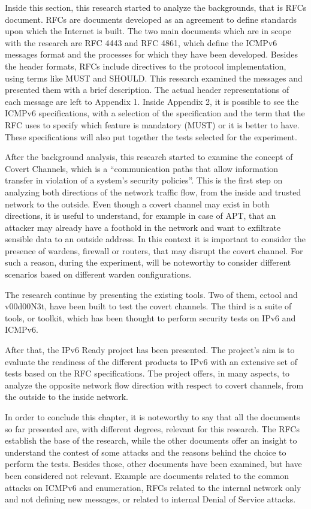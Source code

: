 \documentclass[12pt]{article}
\begin{document}
Inside this section, this research started to analyze the backgrounds, that is RFCs document. RFCs are documents developed as an agreement to define standards upon which the Internet is built. The two main documents which are in scope with the research are RFC 4443 and RFC 4861, which define the ICMPv6 messages format and the processes for which they have been developed. Besides the header formats, RFCs include directives to the protocol implementation, using terms like MUST and SHOULD. This research examined the messages and presented them with a brief description. The actual header representations of each message are left to Appendix 1. Inside Appendix 2, it is possible to see the ICMPv6 specifications, with a selection of the specification and the term that the RFC uses to specify which feature is mandatory (MUST) or it is better to have. These specifications will also put together the tests selected for the experiment.

After the background analysis, this research started to examine the concept of Covert Channels, which is a ``communication paths that allow information transfer in violation of a system’s security policies''. This is the first step on analyzing both directions of the network traffic flow, from the inside and trusted network to the outside. Even though a covert channel may exist in both directions, it is useful to understand, for example in case of APT, that an attacker may already have a foothold in the network and want to exfiltrate sensible data to an outside address. In this context it is important to consider the presence of wardens, firewall or routers, that may disrupt the covert channel. For such a reason, during the experiment, will be noteworthy to consider different scenarios based on different warden configurations.

The research continue by presenting the existing tools. Two of them, cctool and v00d00N3t, have been built to test the covert channels. The third is a suite of tools, or toolkit, which has been thought to perform security tests on IPv6 and ICMPv6.

After that, the IPv6 Ready project has been presented. The project's aim is to evaluate the readiness of the different products to IPv6 with an extensive set of tests based on the RFC specifications. The project offers, in many aspects, to analyze the opposite network flow direction with respect to covert channels, from the outside to the inside network.

In order to conclude this chapter, it is noteworthy to say that all the documents so far presented are, with different degrees, relevant for this research. The RFCs establish the base of the research, while the other documents offer an insight to understand the contest of some attacks and the reasons behind the choice to perform the tests. Besides those, other documents have been examined, but have been considered not relevant. Example are documents related to the common attacks on ICMPv6 and enumeration\cite{sans}, RFCs related to the internal network only and not defining new messages\cite{rfc4862}, or related to internal Denial of Service 
attacks\cite{smurf}.
\end{document}
